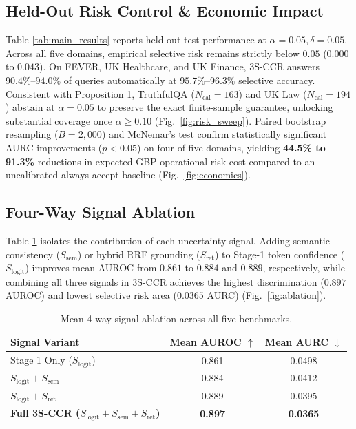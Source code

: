 \documentclass[10pt,conference]{IEEEtran}
\begin{document}
\subsection{Held-Out Risk Control \& Economic Impact}
Table \ref{tab:main_results} reports held-out test performance at $\alpha = 0.05, \delta = 0.05$. Across all five domains, empirical selective risk remains strictly below $0.05$ ($0.000$ to $0.043$). On FEVER, UK Healthcare, and UK Finance, 3S-CCR answers $90.4\%\text{--}94.0\%$ of queries automatically at $95.7\%\text{--}96.3\%$ selective accuracy. Consistent with Proposition 1, TruthfulQA ($N_{\text{cal}}=163$) and UK Law ($N_{\text{cal}}=194$) abstain at $\alpha = 0.05$ to preserve the exact finite-sample guarantee, unlocking substantial coverage once $\alpha \ge 0.10$ (Fig.\ \ref{fig:risk_sweep}). Paired bootstrap resampling ($B=2,000$) and McNemar's test confirm statistically significant AURC improvements ($p < 0.05$) on four of five domains, yielding \textbf{44.5\% to 91.3\%} reductions in expected GBP operational risk cost compared to an uncalibrated always-accept baseline (Fig.\ \ref{fig:economics}).

\subsection{Four-Way Signal Ablation}
Table \ref{tab:ablation} isolates the contribution of each uncertainty signal. Adding semantic consistency ($S_{\text{sem}}$) or hybrid RRF grounding ($S_{\text{ret}}$) to Stage-1 token confidence ($S_{\text{logit}}$) improves mean AUROC from $0.861$ to $0.884$ and $0.889$, respectively, while combining all three signals in 3S-CCR achieves the highest discrimination ($0.897$ AUROC) and lowest selective risk area ($0.0365$ AURC) (Fig.\ \ref{fig:ablation}).

\begin{table}[t]
\centering
\caption{Mean 4-way signal ablation across all five benchmarks.}
\label{tab:ablation}
\begin{tabular}{lcc}
\toprule
\textbf{Signal Variant} & \textbf{Mean AUROC $\uparrow$} & \textbf{Mean AURC $\downarrow$} \\
\midrule
Stage 1 Only ($S_{\text{logit}}$) & 0.861 & 0.0498 \\
$S_{\text{logit}} + S_{\text{sem}}$ & 0.884 & 0.0412 \\
$S_{\text{logit}} + S_{\text{ret}}$ & 0.889 & 0.0395 \\
\textbf{Full 3S-CCR ($S_{\text{logit}} + S_{\text{sem}} + S_{\text{ret}}$)} & \textbf{0.897} & \textbf{0.0365} \\
\bottomrule
\end{tabular}
\end{table}
\end{document}
